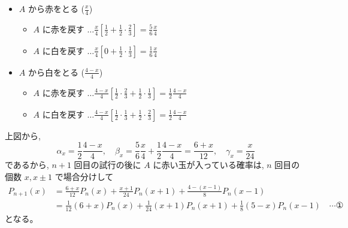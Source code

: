 \documentclass[../main.tex]{subfiles}
\begin{document}
\begin{itemize}
  \item $A$ から赤をとる ($\frac{x}{4}$)
    \begin{itemize}
      \item $A$ に赤を戻す \quad $\dots \frac{x}{4} \left[ \frac{1}{2} + \frac{1}{2} \cdot \frac{2}{3} \right] = \frac{5}{6} \frac{x}{4}$
      \item $A$ に白を戻す \quad $\dots \frac{x}{4} \left[ 0 + \frac{1}{2} \cdot \frac{1}{3} \right] = \frac{1}{6} \frac{x}{4}$
    \end{itemize}
  \item $A$ から白をとる ($\frac{4-x}{4}$)
    \begin{itemize}
      \item $A$ に赤を戻す \quad $\dots \frac{4-x}{4} \left[ \frac{1}{2} \cdot \frac{2}{3} + \frac{1}{2} \cdot \frac{1}{3} \right] = \frac{1}{2} \frac{4-x}{4}$
      \item $A$ に白を戻す \quad $\dots \frac{4-x}{4} \left[ \frac{1}{2} \cdot \frac{1}{3} + \frac{1}{2} \cdot \frac{2}{3} \right] = \frac{1}{2} \frac{4-x}{4}$
    \end{itemize}
\end{itemize}

上図から,
\[
  \alpha_x = \frac{1}{2} \frac{4-x}{4}, \quad \beta_x = \frac{5}{6} \frac{x}{4} + \frac{1}{2} \frac{4-x}{4} = \frac{6+x}{12}, \quad \gamma_x = \frac{x}{24}
\]
であるから, $n+1$ 回目の試行の後に $A$ に赤い玉が入っている確率は, $n$ 回目の個数 $x, x \pm 1$ で場合分けして
\[
  \begin{aligned}
    P_{n+1}(x) &= \frac{6+x}{12} P_n(x) + \frac{x+1}{24} P_n(x+1) + \frac{4-(x-1)}{8} P_n(x-1) \\
    &= \frac{1}{12}(6+x) P_n(x) + \frac{1}{24}(x+1) P_n(x+1) + \frac{1}{8}(5-x) P_n(x-1) \quad \cdots \text{①}
  \end{aligned}
\]
となる。
\end{document}
